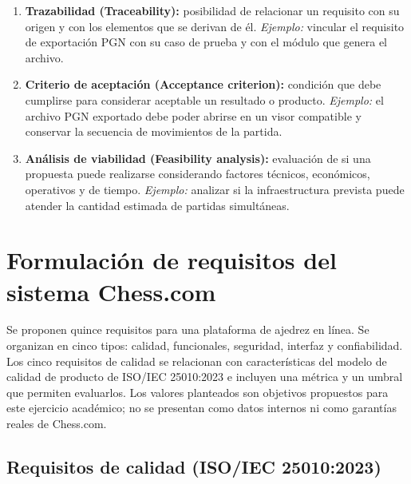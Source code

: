 \documentclass[12pt,a4paper]{article}
\begin{document}
\begin{enumerate}[leftmargin=*]
    \item \textbf{Trazabilidad (Traceability):} posibilidad de relacionar un requisito con su origen y con los elementos que se derivan de él. \textit{Ejemplo:} vincular el requisito de exportación PGN con su caso de prueba y con el módulo que genera el archivo.
    \item \textbf{Criterio de aceptación (Acceptance criterion):} condición que debe cumplirse para considerar aceptable un resultado o producto. \textit{Ejemplo:} el archivo PGN exportado debe poder abrirse en un visor compatible y conservar la secuencia de movimientos de la partida.
    \item \textbf{Análisis de viabilidad (Feasibility analysis):} evaluación de si una propuesta puede realizarse considerando factores técnicos, económicos, operativos y de tiempo. \textit{Ejemplo:} analizar si la infraestructura prevista puede atender la cantidad estimada de partidas simultáneas.
\end{enumerate}

\newpage
\section{Formulación de requisitos del sistema Chess.com}

Se proponen quince requisitos para una plataforma de ajedrez en línea. Se organizan en cinco tipos: calidad, funcionales, seguridad, interfaz y confiabilidad. Los cinco requisitos de calidad se relacionan con características del modelo de calidad de producto de ISO/IEC 25010:2023 e incluyen una métrica y un umbral que permiten evaluarlos. Los valores planteados son objetivos propuestos para este ejercicio académico; no se presentan como datos internos ni como garantías reales de Chess.com.

\subsection{Requisitos de calidad (ISO/IEC 25010:2023)}
\end{document}

